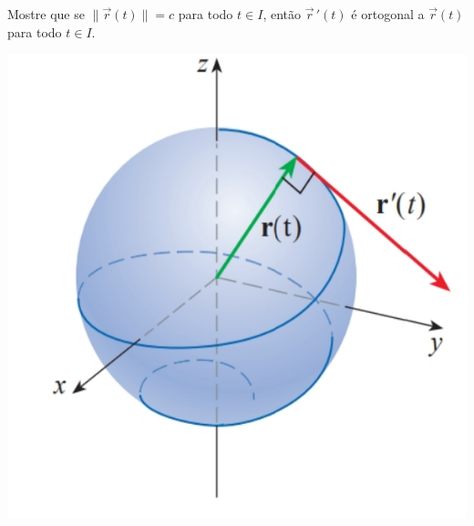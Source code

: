 \begin{frame}[label=fun-vet]
\begin{exe}
Mostre que se $\|\vec{r}(t)\|=c$ para todo $t\in I$, então $\vec{r}\,'(t)$ é ortogonal a $\vec{r}(t)$ para todo $t\in I$.
\end{exe}

\begin{center}
\includegraphics[scale=0.4]{figuras/vetor-const.png}
\end{center}
\end{frame}

%
%
%

